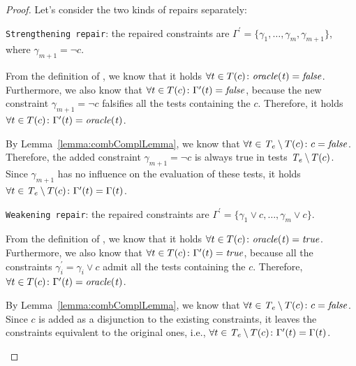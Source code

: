 \begin{tikzborder}{\cite{Gargantini16:validation}}
\begin{tikzborder}{\cite{gargantini_combinatorial_2017}}
\begin{tikzborder}{\cite{garn2019}}
\begin{tikzborder}{\cite{arcaini2019achieving}}
\begin{tikzborder}{\cite{arcaini2019varivolution}}
		\begin{proof}
			Let's consider the two kinds of repairs separately:
			\begin{compactitem}
				\item {\tt Strengthening repair}: the repaired constraints are $\Gamma^\prime = \{\gamma_1, \dots, \gamma_m, \gamma_{m+1}\}$, where $\gamma_{m+1} = \neg c$.
				\begin{compactenum}
					\item From the definition of \underConstr \fcc, we know that it holds $\forall t \in T(c) \colon \mathit{oracle(t)} = \mathit{false}$. Furthermore, we also know that $\forall t \in T(c) \colon \Gamma^\prime(t) = \mathit{false}$, because the new constraint $\gamma_{m+1} = \neg c$ falsifies all the tests containing the \fcc $c$. Therefore, it holds $\forall t \in T(c) \colon \Gamma^\prime(t) = \mathit{oracle(t)}$.
					\item
					By Lemma~\ref{lemma:combComplLemma}, we know that $\forall t \in \mathit{T_e} \setminus T(c) \colon c = \mathit{false}$.
					Therefore, the added constraint $\gamma_{m+1} = \neg c$ is always true in tests $\mathit{T_e} \setminus T(c)$. Since $\gamma_{m+1}$ has no influence on the evaluation of these tests, it holds $\forall t \in \mathit{T_e} \setminus T(c) \colon \Gamma^\prime(t) = \Gamma(t)$.
				\end{compactenum}
				\item {\tt Weakening repair}: the repaired constraints are $\Gamma^\prime = \{ \gamma_1 \vee c, \dots, \gamma_m \vee c\}$.
				\begin{compactenum}
					\item From the definition of \overConstr \fcc, we know that it holds $\forall t \in T(c) \colon \mathit{oracle(t)} = \mathit{true}$.
					Furthermore, we also know that $\forall t \in T(c) \colon \Gamma^\prime(t) = \mathit{true}$, because all the constraints $\gamma_i^\prime = \gamma_i \vee c$ admit all the tests containing the \fcc $c$. Therefore, $\forall t \in T(c) \colon \Gamma^\prime(t) = \mathit{oracle(t)}$.
					\item
					By Lemma~\ref{lemma:combComplLemma}, we know that $\forall t \in \mathit{T_e} \setminus T(c) \colon c = \mathit{false}$. Since $c$ is added as a disjunction to the existing constraints, it leaves the constraints equivalent to the original ones, i.e., $\forall t \in \mathit{T_e} \setminus T(c) \colon \Gamma^\prime(t) = \Gamma(t)$.
				\end{compactenum}
			\end{compactitem}
		\end{proof}
		\be
		

\end{tikzborder}
\end{tikzborder}
\end{tikzborder}
\end{tikzborder}
\end{tikzborder}
